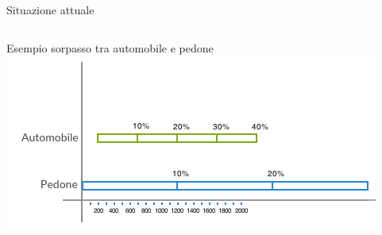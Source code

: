 \begin{frame}{Situazione attuale}
{\begin{columns}
\begin{column}{0.3\textwidth}
			\end{column}
		\end{columns}
	}
	{
		Esempio sorpasso tra automobile e pedone
		\centering
		\includegraphics[scale=0.5]{images/timeline.png}
	}
\end{frame}

